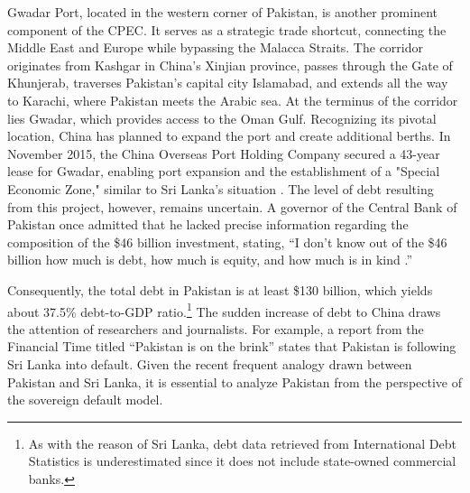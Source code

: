 Gwadar Port, located in the western corner of Pakistan, is another prominent component of the CPEC. It serves as a strategic trade shortcut, connecting the Middle East and Europe while bypassing the Malacca Straits. The corridor originates from Kashgar in China's Xinjian province, passes through the Gate of Khunjerab, traverses Pakistan's capital city Islamabad, and extends all the way to Karachi, where Pakistan meets the Arabic sea. At the terminus of the corridor lies Gwadar, which provides access to the Oman Gulf. Recognizing its pivotal location, China has planned to expand the port and create additional berths. In November 2015, the China Overseas Port Holding Company secured a 43-year lease for Gwadar, enabling port expansion and the establishment of a "Special Economic Zone," similar to Sri Lanka's situation \citep{Ranade-17-CPEC}.
The level of debt resulting from this project, however, remains uncertain. A governor of the Central Bank of Pakistan once admitted that he lacked precise information regarding the composition of the \$46 billion investment, stating, ``I don't know out of the \$46 billion how much is debt, how much is equity, and how much is in kind \citep{small2020returning}.''

Consequently, the total debt in Pakistan is at least \$130 billion, which yields about 37.5\% debt-to-GDP ratio.\footnote{
    As with the reason of Sri Lanka, debt data retrieved from International Debt Statistics is underestimated since it does not include state-owned commercial banks.
}
The sudden increase of debt to China draws the attention of researchers and journalists. For example, a report from the Financial Time titled ``Pakistan is on the brink'' states that Pakistan is following Sri Lanka into default.
Given the recent frequent analogy drawn between Pakistan and Sri Lanka, it is essential to analyze Pakistan from the perspective of the sovereign default model.
